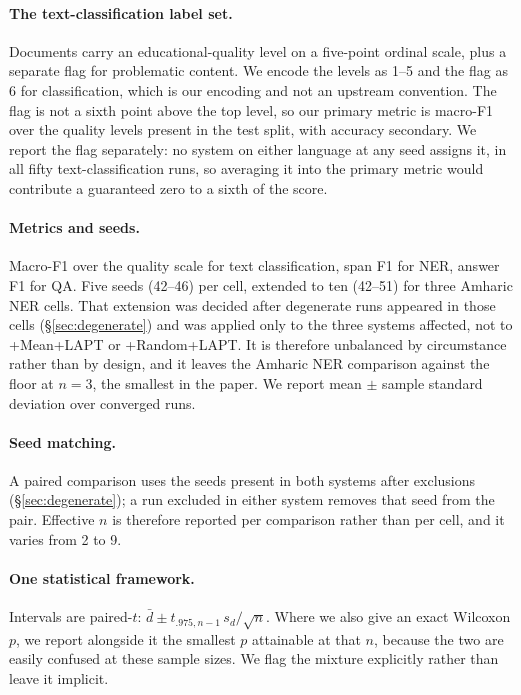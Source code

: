 \documentclass[11pt]{article}
\begin{document}
\paragraph{The text-classification label set.} Documents carry an
educational-quality level on a five-point ordinal scale, plus a separate flag
for problematic content. We encode the levels as 1--5 and the flag as 6 for
classification, which is our encoding and not an upstream convention. The
flag is not a sixth point above the top level, so our primary metric is
macro-F1 over the quality levels present in the test split, with accuracy
secondary. We report the flag separately: no system on either language at any
seed assigns it, in all fifty text-classification runs, so averaging it into
the primary metric would contribute a guaranteed zero to a sixth of the
score.

\paragraph{Metrics and seeds.} Macro-F1 over the quality scale for text
classification, span F1 for NER, answer F1 for QA. Five seeds (42--46) per
cell, extended to ten (42--51) for three Amharic NER cells. That extension
was decided after degenerate runs appeared in those cells
(\S\ref{sec:degenerate}) and was applied only to the three systems affected,
not to +Mean+LAPT or +Random+LAPT. It is therefore unbalanced by
circumstance rather than by design, and it leaves the Amharic NER comparison
against the floor at $n=3$, the smallest in the paper. We report mean
$\pm$ sample standard deviation over converged runs.

\paragraph{Seed matching.} A paired comparison uses the seeds present in both
systems after exclusions (\S\ref{sec:degenerate}); a run excluded in either
system removes that seed from the pair. Effective $n$ is therefore reported
per comparison rather than per cell, and it varies from 2 to 9.

\paragraph{One statistical framework.} Intervals are paired-$t$:
$\bar{d} \pm t_{.975,n-1}\, s_d/\sqrt{n}$. Where we also give an exact
Wilcoxon $p$, we report alongside it the smallest $p$ attainable at that $n$,
because the two are easily confused at these sample sizes. We flag the
mixture explicitly rather than leave it implicit.
\end{document}

